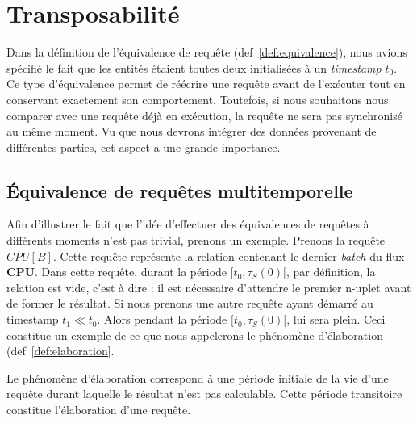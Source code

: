 \section{Transposabilité}\label{sec:contrib:astral:transposabilite}
Dans la définition de l'équivalence de requête (def~\ref{def:equivalence}), nous avions spécifié le fait que les entités étaient toutes deux initialisées à un \textit{timestamp} $t_0$. Ce type d'équivalence permet de réécrire une requête avant de l'exécuter tout en conservant exactement son comportement. Toutefois, si nous souhaitons nous comparer avec une requête déjà en exécution, la requête ne sera pas synchronisé au même moment. Vu que nous devrons intégrer des données provenant de différentes parties, cet aspect a une grande importance.
\subsection{Équivalence de requêtes multitemporelle}
Afin d'illustrer le fait que l'idée d'effectuer des équivalences de requêtes à différents moments n'est pas trivial, prenons un exemple. Prenons la requête $CPU[B]$. Cette requête représente la relation contenant le dernier \textit{batch} du flux \textbf{CPU}. Dans cette requête, durant la période $[t_0,\tau_S(0)[$, par définition, la relation est vide, c'est à dire : il est nécessaire d'attendre le premier n-uplet avant de former le résultat. Si nous prenons une autre requête ayant démarré au timestamp $t_1 \ll t_0$. Alors pendant la période $[t_0,\tau_S(0)[$, lui sera plein. Ceci constitue un exemple de ce que nous appelerons le phénomène d'élaboration (def~\ref{def:elaboration}.
\begin{defi}\label{def:elaboration}
    Le phénomène d'élaboration correspond à une période initiale de la vie d'une requête durant laquelle le résultat n'est pas calculable. Cette période transitoire constitue l'élaboration d'une requête.
\end{defi}

